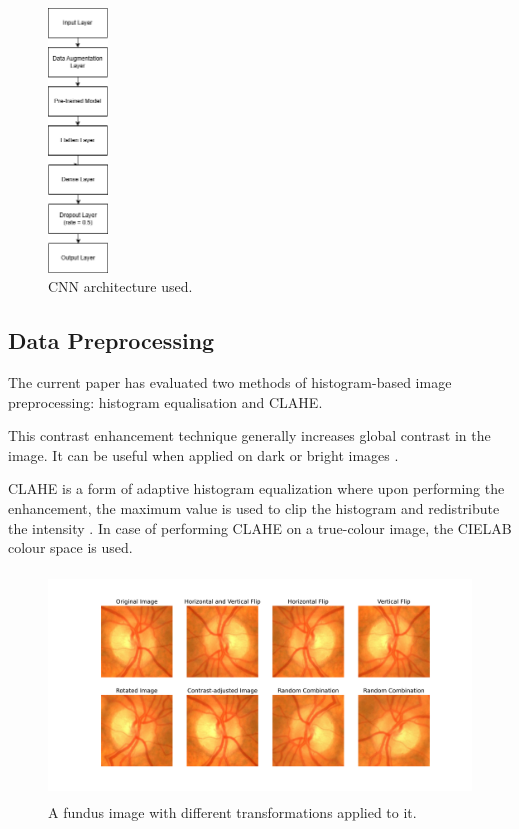 \documentclass{article}
\begin{document}
\begin{figure}
	\centering
    \includegraphics[height=7cm]{images/arch.png}
	\caption{CNN architecture used.}
	\label{fig:fig1}
\end{figure}

\subsection{Data Preprocessing}

The current paper has evaluated two methods of histogram-based image preprocessing: histogram equalisation and CLAHE.

\begin{description}[leftmargin=0cm,style=nextline]
    \item[Histogram Equalization] This contrast enhancement technique generally increases global contrast in the image. It can be useful when applied on dark or bright images \cite{b22}.
    
    \item[Contrast Limited Adaptive Histogram Equalization] CLAHE is a form of adaptive histogram equalization where upon performing the enhancement, the maximum value is used to clip the histogram and redistribute the intensity \cite{b23}. In case of performing CLAHE on a true-colour image, the CIELAB colour space is used.
\end{description}

\begin{figure}
	\centering
    \includegraphics[height=6cm]{images/transformations.png}
	\caption{A fundus image with different transformations applied to it.}
	\label{fig:fig2}
\end{figure}
\end{document}
